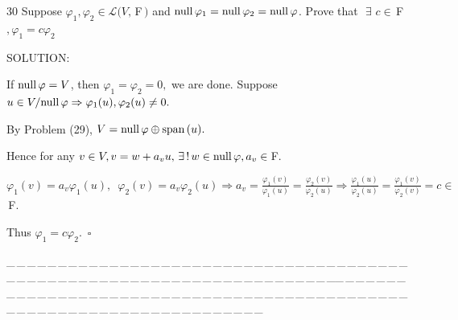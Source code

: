 \documentclass[a4paper, 11pt, UTF8]{article}
\def\null{\textup{null\,}}
\def\Spn{\textup{span}\,}
\def\Lm{\mathcal{L}}
\def\Fbf{$\,{\timesbf F}\,$}
\def\Fbfc{$\,{\timesbf F}$}
\begin{document}
\begin{large}
{\timesbf\Large 30} {\timessl\Large 
Suppose $\varphi_1,\varphi_2\in\Lm(V,\Fbf)$ and $\null\varphi_1=\null\varphi_2=\null\varphi$. Prove that $\,\,\exists\,\,c\in\Fbf,\varphi_1=c\varphi_2$
}\par
{\timesbf S\footnotesize{OLUTION:}}\par\quad\Large
If $\null\varphi=V$, then $\varphi_1=\varphi_2=0,$ we are done. Suppose $u\in V/\null\varphi\Rightarrow\varphi_1(u),\varphi_2(u)\neq 0.$\par\quad
By Problem (29), $V=\null\varphi\oplus\Spn(u).$\par\quad
Hence for any $v\in V,v=w+a_v u,\,\exists\,!\,w\in\null\varphi,a_v\in\Fbfc.$\par\quad
$\varphi_1(v)=a_v\varphi_1(u),\,\,\,\varphi_2(v)=a_v\varphi_2(u)\Rightarrow a_v=\displaystyle\frac{\varphi_1(v)}{\varphi_1(u)}=\frac{\varphi_2(v)}{\varphi_2(u)}\Rightarrow\frac{\varphi_1(u)}{\varphi_2(u)}=\frac{\varphi_1(v)}{\varphi_2(v)}=c\in\Fbfc.$\par\quad
Thus $\varphi_1=c\varphi_2.\,\,\,\square$\par\large
{\tiny \_\,\_\,\_\,\_\,\_\,\_\,\_\,\_\,\_\,\_\,\_\,\_\,\_\,\_\,\_\,\_\,\_\,\_\,\_\,\_\,\_\,\_\,\_\,\_\,\_\,\_\,\_\,\_\,\_\,\_\,\_\,\_\,\_\,\_\,\_\,\_\,\_\,\_\,\_\,\_\,\_\,\_\,\_\,\_\,\_\,\_\,\_\,\_\,\_\,\_\,\_\,\_\,\_\,\_\,\_\,\_\,\_\,\_\,\_\,\_\,\_\,\_\,\_\,\_\,\_\,\_\,\_\,\_\,\_\,\_\,\_\_\,\_\,\_\,\_\,\_\,\_\,\_\,\_\,\_\,\_\,\_\,\_\,\_\,\_\,\_\,\_\,\_\,\_\,\_\,\_\,\_\,\_\,\_\,\_\,\_\,\_\,\_\,\_\,\_\,\_\,\_\,\_\,\_\,\_\,\_\,\_\,\_\,\_\,\_\,\_\,\_\,\_\,\_\,\_\,\_\,\_\,\_\,\_\,\_\,\_\,\_\,\_\,\_\,\_\,\_\,\_\,\_\,\_\,\_\,\_\,\_\,\_\,\_\,\_\,\_\,\_\,\_\,\_\,\_\,\_\,\_}\par


\end{large}
\end{document}
